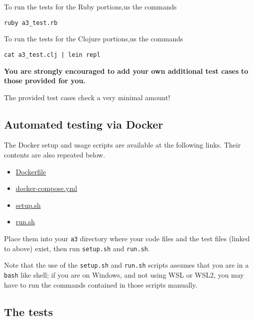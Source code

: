 \documentclass[11pt]{article}
\theoremstyle{definition}
\begin{document}
To run the tests for the Ruby portions,us the commands
\begin{verbatim}
ruby a3_test.rb
\end{verbatim}

To run the tests for the Clojure portions,us the commands
\begin{verbatim}
cat a3_test.clj | lein repl
\end{verbatim}

\begin{center}
\textbf{You are strongly encouraged to add your own additional test cases}
\textbf{to those provided for you.}

The provided test cases check a very minimal amount!
\end{center}

\subsection*{Automated testing via Docker}
\label{sec:orgffbbba5}
The Docker setup and usage scripts are available at the following links.
Their contents are also repeated below.
\begin{itemize}
\item \href{./testing/a3/Dockerfile}{Dockerfile}
\item \href{./testing/a3/docker-compose.yml}{docker-compose.yml}
\item \href{./testing/a3/setup.sh}{setup.sh}
\item \href{./testing/a3/run.sh}{run.sh}
\end{itemize}
Place them into your \texttt{a3} directory where your code files
and the test files (linked to above) exist,
then run \texttt{setup.sh} and \texttt{run.sh}.

Note that the use of the \texttt{setup.sh} and \texttt{run.sh} scripts assumes
that you are in a \texttt{bash} like shell; if you are on Windows,
and not using WSL or WSL2, you may have
to run the commands contained in those scripts manually.

\subsection*{The tests}
\label{sec:org1e6d27e}
\end{document}
